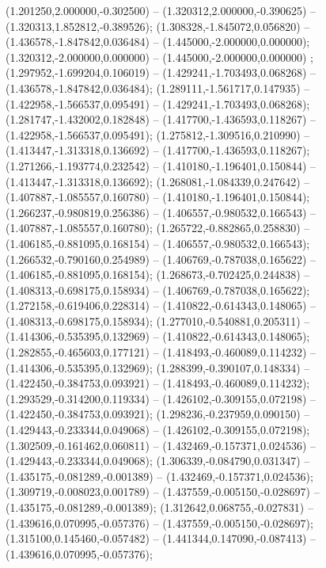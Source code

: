  (1.201250,2.000000,-0.302500) -- (1.320312,2.000000,-0.390625) -- (1.320313,1.852812,-0.389526);
 (1.308328,-1.845072,0.056820) -- (1.436578,-1.847842,0.036484) -- (1.445000,-2.000000,0.000000);
 (1.320312,-2.000000,0.000000) -- (1.445000,-2.000000,0.000000) ;
 (1.297952,-1.699204,0.106019) -- (1.429241,-1.703493,0.068268) -- (1.436578,-1.847842,0.036484);
 (1.289111,-1.561717,0.147935) -- (1.422958,-1.566537,0.095491) -- (1.429241,-1.703493,0.068268);
 (1.281747,-1.432002,0.182848) -- (1.417700,-1.436593,0.118267) -- (1.422958,-1.566537,0.095491);
 (1.275812,-1.309516,0.210990) -- (1.413447,-1.313318,0.136692) -- (1.417700,-1.436593,0.118267);
 (1.271266,-1.193774,0.232542) -- (1.410180,-1.196401,0.150844) -- (1.413447,-1.313318,0.136692);
 (1.268081,-1.084339,0.247642) -- (1.407887,-1.085557,0.160780) -- (1.410180,-1.196401,0.150844);
 (1.266237,-0.980819,0.256386) -- (1.406557,-0.980532,0.166543) -- (1.407887,-1.085557,0.160780);
 (1.265722,-0.882865,0.258830) -- (1.406185,-0.881095,0.168154) -- (1.406557,-0.980532,0.166543);
 (1.266532,-0.790160,0.254989) -- (1.406769,-0.787038,0.165622) -- (1.406185,-0.881095,0.168154);
 (1.268673,-0.702425,0.244838) -- (1.408313,-0.698175,0.158934) -- (1.406769,-0.787038,0.165622);
 (1.272158,-0.619406,0.228314) -- (1.410822,-0.614343,0.148065) -- (1.408313,-0.698175,0.158934);
 (1.277010,-0.540881,0.205311) -- (1.414306,-0.535395,0.132969) -- (1.410822,-0.614343,0.148065);
 (1.282855,-0.465603,0.177121) -- (1.418493,-0.460089,0.114232) -- (1.414306,-0.535395,0.132969);
 (1.288399,-0.390107,0.148334) -- (1.422450,-0.384753,0.093921) -- (1.418493,-0.460089,0.114232);
 (1.293529,-0.314200,0.119334) -- (1.426102,-0.309155,0.072198) -- (1.422450,-0.384753,0.093921);
 (1.298236,-0.237959,0.090150) -- (1.429443,-0.233344,0.049068) -- (1.426102,-0.309155,0.072198);
 (1.302509,-0.161462,0.060811) -- (1.432469,-0.157371,0.024536) -- (1.429443,-0.233344,0.049068);
 (1.306339,-0.084790,0.031347) -- (1.435175,-0.081289,-0.001389) -- (1.432469,-0.157371,0.024536);
 (1.309719,-0.008023,0.001789) -- (1.437559,-0.005150,-0.028697) -- (1.435175,-0.081289,-0.001389);
 (1.312642,0.068755,-0.027831) -- (1.439616,0.070995,-0.057376) -- (1.437559,-0.005150,-0.028697);
 (1.315100,0.145460,-0.057482) -- (1.441344,0.147090,-0.087413) -- (1.439616,0.070995,-0.057376);
